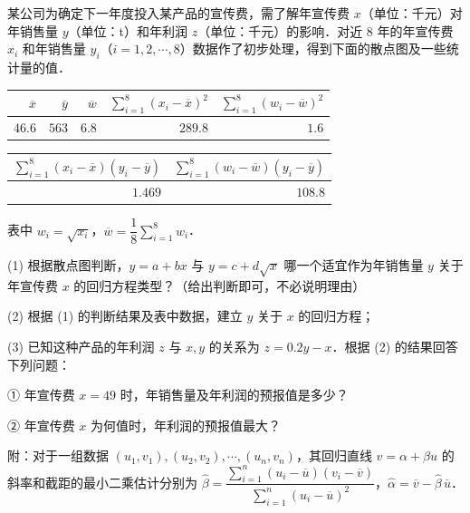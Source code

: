 \begin{question}
某公司为确定下一年度投入某产品的宣传费，需了解年宣传费 $x$（单位：千元）对年销售量 $y$（单位：t）和年利润 $z$（单位：千元）的影响．对近 $8$ 年的年宣传费 $x_i$ 和年销售量 $y_i$（$i=1,2,\cdots,8$）数据作了初步处理，得到下面的散点图及一些统计量的值．
\nopagebreak[4]
\begin{center}\end{center}
\nopagebreak[4]
\begin{center}
\begin{tabular}{rrrrr}
\toprule
$\overline x$ & $\overline y$ & $\overline w$ & $\sum_{i=1}^{8}(x_i-\overline x)^2$ & $\sum_{i=1}^{8}(w_i-\overline w)^2$ \\
\midrule
$46.6$ & $563$ & $6.8$ & $289.8$ & $1.6$ \\
\bottomrule
\end{tabular}
\end{center}

\begin{center}
\begin{tabular}{rr}
\toprule
$\sum_{i=1}^{8}(x_i-\overline x)(y_i-\overline y)$ & $\sum_{i=1}^{8}(w_i-\overline w)(y_i-\overline y)$ \\
\midrule
$1.469$ & $108.8$ \\
\bottomrule
\end{tabular}
\end{center}

表中 $w_i=\sqrt{x_i}$，$\overline w=\dfrac18\sum_{i=1}^{8}w_i$．

(1) 根据散点图判断，$y=a+bx$ 与 $y=c+d\sqrt x$ 哪一个适宜作为年销售量 $y$ 关于年宣传费 $x$ 的回归方程类型？（给出判断即可，不必说明理由）

(2) 根据 (1) 的判断结果及表中数据，建立 $y$ 关于 $x$ 的回归方程；

(3) 已知这种产品的年利润 $z$ 与 $x,y$ 的关系为 $z=0.2y-x$．根据 (2) 的结果回答下列问题：

① 年宣传费 $x=49$ 时，年销售量及年利润的预报值是多少？

② 年宣传费 $x$ 为何值时，年利润的预报值最大？

附：对于一组数据 $(u_1,v_1),(u_2,v_2),\cdots,(u_n,v_n)$，其回归直线 $v=\alpha+\beta u$ 的斜率和截距的最小二乘估计分别为 $\widehat\beta=\dfrac{\sum_{i=1}^{n}(u_i-\overline u)(v_i-\overline v)}{\sum_{i=1}^{n}(u_i-\overline u)^2}$，$\widehat\alpha=\overline v-\widehat\beta\,\overline u$．

\end{question}
